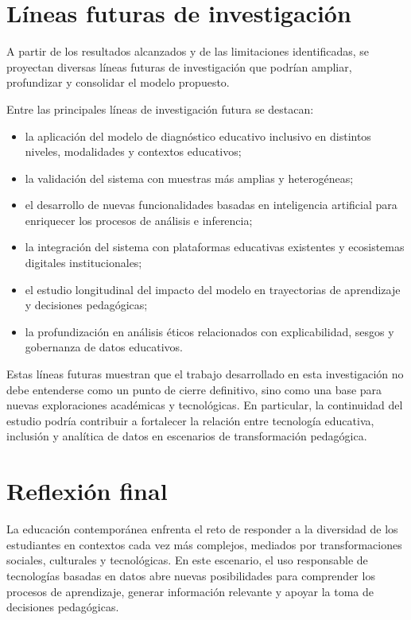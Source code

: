 \begin{refsection}
\section{Líneas futuras de investigación}

A partir de los resultados alcanzados y de las limitaciones identificadas, se proyectan diversas líneas futuras de investigación que podrían ampliar, profundizar y consolidar el modelo propuesto.

Entre las principales líneas de investigación futura se destacan:

\begin{itemize}
\item la aplicación del modelo de diagnóstico educativo inclusivo en distintos niveles, modalidades y contextos educativos;
\item la validación del sistema con muestras más amplias y heterogéneas;
\item el desarrollo de nuevas funcionalidades basadas en inteligencia artificial para enriquecer los procesos de análisis e inferencia;
\item la integración del sistema con plataformas educativas existentes y ecosistemas digitales institucionales;
\item el estudio longitudinal del impacto del modelo en trayectorias de aprendizaje y decisiones pedagógicas;
\item la profundización en análisis éticos relacionados con explicabilidad, sesgos y gobernanza de datos educativos.
\end{itemize}

Estas líneas futuras muestran que el trabajo desarrollado en esta investigación no debe entenderse como un punto de cierre definitivo, sino como una base para nuevas exploraciones académicas y tecnológicas. En particular, la continuidad del estudio podría contribuir a fortalecer la relación entre tecnología educativa, inclusión y analítica de datos en escenarios de transformación pedagógica.

\section{Reflexión final}

La educación contemporánea enfrenta el reto de responder a la diversidad de los estudiantes en contextos cada vez más complejos, mediados por transformaciones sociales, culturales y tecnológicas. En este escenario, el uso responsable de tecnologías basadas en datos abre nuevas posibilidades para comprender los procesos de aprendizaje, generar información relevante y apoyar la toma de decisiones pedagógicas.


\end{refsection}
